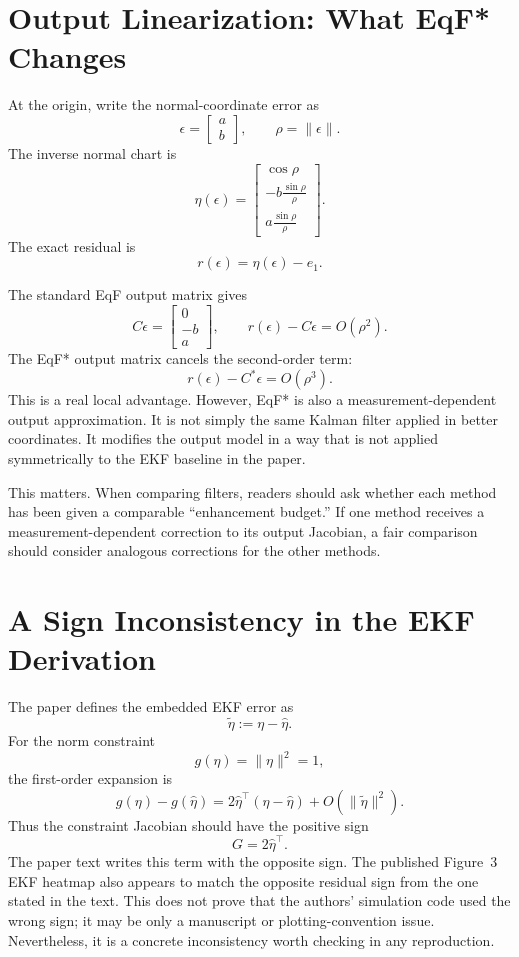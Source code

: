 \documentclass[11pt]{article}
\begin{document}
\section{Output Linearization: What EqF* Changes}

At the origin, write the normal-coordinate error as
\[
    \epsilon = \begin{bmatrix} a \\ b \end{bmatrix}, \qquad
    \rho = \|\epsilon\|.
\]
The inverse normal chart is
\[
    \eta(\epsilon)
    =
    \begin{bmatrix}
        \cos\rho \\
        -b \frac{\sin\rho}{\rho} \\
        a \frac{\sin\rho}{\rho}
    \end{bmatrix}.
\]
The exact residual is
\[
    r(\epsilon) = \eta(\epsilon) - e_1 .
\]

The standard EqF output matrix gives
\[
    C\epsilon = \begin{bmatrix}0\\-b\\a\end{bmatrix},
    \qquad
    r(\epsilon)-C\epsilon = O(\rho^2).
\]
The EqF* output matrix cancels the second-order term:
\[
    r(\epsilon)-C^*\epsilon = O(\rho^3).
\]
This is a real local advantage.  However, EqF* is also a
measurement-dependent output approximation.  It is not simply the same Kalman
filter applied in better coordinates.  It modifies the output model in a way
that is not applied symmetrically to the EKF baseline in the paper.

This matters.  When comparing filters, readers should ask whether each method
has been given a comparable ``enhancement budget.''  If one method receives a
measurement-dependent correction to its output Jacobian, a fair comparison
should consider analogous corrections for the other methods.

\section{A Sign Inconsistency in the EKF Derivation}

The paper defines the embedded EKF error as
\[
    \tilde\eta := \eta - \hat\eta .
\]
For the norm constraint
\[
    g(\eta)=\|\eta\|^2=1,
\]
the first-order expansion is
\[
    g(\eta)-g(\hat\eta)
    =
    2\hat\eta^\top(\eta-\hat\eta)
    + O(\|\tilde\eta\|^2).
\]
Thus the constraint Jacobian should have the positive sign
\[
    G = 2\hat\eta^\top .
\]
The paper text writes this term with the opposite sign.  The published
Figure~3 EKF heatmap also appears to match the opposite residual sign from the
one stated in the text.  This does not prove that the authors' simulation code
used the wrong sign; it may be only a manuscript or plotting-convention issue.
Nevertheless, it is a concrete inconsistency worth checking in any
reproduction.
\end{document}
